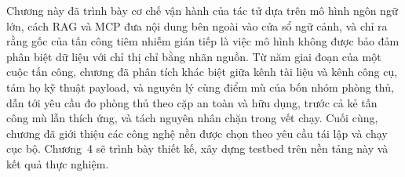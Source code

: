\documentclass[../DoAn.tex]{subfiles}
\begin{document}
Chương này đã trình bày cơ chế vận hành của tác tử dựa trên mô hình ngôn ngữ lớn, cách RAG và MCP đưa nội dung bên ngoài vào cửa sổ ngữ cảnh, và chỉ ra rằng gốc của tấn công tiêm nhiễm gián tiếp là việc mô hình không được bảo đảm phân biệt dữ liệu với chỉ thị chỉ bằng nhãn nguồn. Từ năm giai đoạn của một cuộc tấn công, chương đã phân tích khác biệt giữa kênh tài liệu và kênh công cụ, tám họ kỹ thuật payload, và nguyên lý cùng điểm mù của bốn nhóm phòng thủ, dẫn tới yêu cầu đo phòng thủ theo cặp an toàn và hữu dụng, trước cả kẻ tấn công mù lẫn thích ứng, và tách nguyên nhân chặn trong vết chạy. Cuối cùng, chương đã giới thiệu các công nghệ nền được chọn theo yêu cầu tái lập và chạy cục bộ. Chương~4 sẽ trình bày thiết kế, xây dựng testbed trên nền tảng này và kết quả thực nghiệm.
\end{document}
